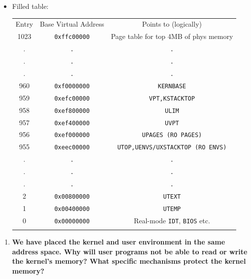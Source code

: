 \documentclass[]{article}
\begin{document}
\begin{itemize}
\item
  Filled table:

  \begin{longtable}[c]{@{}ccc@{}}
  \hline\noalign{\medskip}
  Entry & Base Virtual Address & Points to (logically)
  \\\noalign{\medskip}
  \hline\noalign{\medskip}
  1023 & \texttt{0xffc00000} & Page table for top 4MB of phys memory
  \\\noalign{\medskip}
  . & \texttt{.} & \texttt{.}
  \\\noalign{\medskip}
  . & \texttt{.} & \texttt{.}
  \\\noalign{\medskip}
  . & \texttt{.} & \texttt{.}
  \\\noalign{\medskip}
  960 & \texttt{0xf0000000} & \texttt{KERNBASE}
  \\\noalign{\medskip}
  959 & \texttt{0xefc00000} & \texttt{VPT,KSTACKTOP}
  \\\noalign{\medskip}
  958 & \texttt{0xef800000} & \texttt{ULIM}
  \\\noalign{\medskip}
  957 & \texttt{0xef400000} & \texttt{UVPT}
  \\\noalign{\medskip}
  956 & \texttt{0xef000000} & \texttt{UPAGES (RO PAGES)}
  \\\noalign{\medskip}
  955 & \texttt{0xeec00000} & \texttt{UTOP,UENVS/UXSTACKTOP (RO ENVS)}
  \\\noalign{\medskip}
  . & \texttt{.} & \texttt{.}
  \\\noalign{\medskip}
  . & \texttt{.} & \texttt{.}
  \\\noalign{\medskip}
  . & \texttt{.} & \texttt{.}
  \\\noalign{\medskip}
  2 & \texttt{0x00800000} & \texttt{UTEXT}
  \\\noalign{\medskip}
  1 & \texttt{0x00400000} & \texttt{UTEMP}
  \\\noalign{\medskip}
  0 & \texttt{0x00000000} & Real-mode \texttt{IDT}, \texttt{BIOS} etc.
  \\\noalign{\medskip}
  \hline
  \end{longtable}
\end{itemize}

\begin{enumerate}
\def\labelenumi{\arabic{enumi}.}
\setcounter{enumi}{2}
\itemsep1pt\parskip0pt
\item
  \textbf{We have placed the kernel and user environment in the same
  address space. Why will user programs not be able to read or write the
  kernel's memory? What specific mechanisms protect the kernel memory?}
\end{enumerate}
\end{document}
